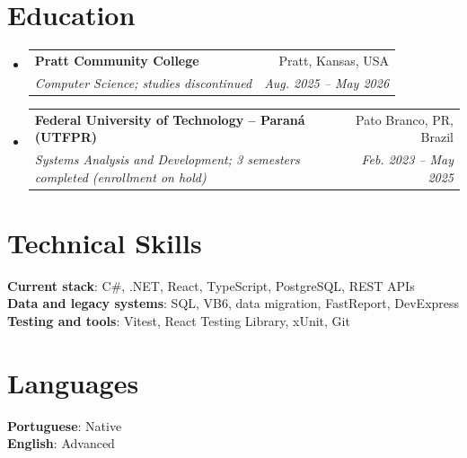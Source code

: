 \documentclass[letterpaper,11pt]{article}
\newcommand{\resumeSubheading}[4]{
  \vspace{-2pt}\item
    \begin{tabularx}{0.97\textwidth}[t]{>{\raggedright\arraybackslash}X r}
      \textbf{#1} & #2 \\
      \textit{\small#3} & \textit{\small #4} \\
    \end{tabularx}\vspace{-7pt}
}
\newcommand{\resumeSubHeadingListStart}{\begin{itemize}[leftmargin=0.15in, label={}]}
\newcommand{\resumeSubHeadingListEnd}{\end{itemize}}
\begin{document}
\section{Education}
  \resumeSubHeadingListStart
    \resumeSubheading
      {Pratt Community College}{Pratt, Kansas, USA}
      {Computer Science; studies discontinued}{Aug. 2025 -- May 2026}
    \resumeSubheading
      {Federal University of Technology -- Paran\'a (UTFPR)}{Pato Branco, PR, Brazil}
      {Systems Analysis and Development; 3 semesters completed (enrollment on hold)}{Feb. 2023 -- May 2025}
  \resumeSubHeadingListEnd

\section{Technical Skills}
  \begin{itemize}[leftmargin=0.15in, label={}]
    \small{\item{
      \textbf{Current stack}: C\#, .NET, React, TypeScript, PostgreSQL, REST APIs \\
      \textbf{Data and legacy systems}: SQL, VB6, data migration, FastReport, DevExpress \\
      \textbf{Testing and tools}: Vitest, React Testing Library, xUnit, Git
    }}
  \end{itemize}

\section{Languages}
  \begin{itemize}[leftmargin=0.15in, label={}]
    \small{\item{\textbf{Portuguese}: Native \\ \textbf{English}: Advanced}}
  \end{itemize}
\end{document}
